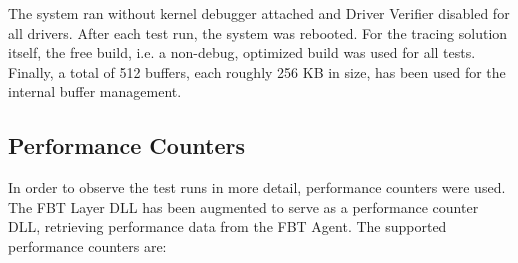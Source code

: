The system ran without kernel debugger attached and Driver Verifier disabled for all drivers.
After each test run, the system was rebooted. For the tracing solution itself, the free 
build, i.e. a non-debug, optimized build was used for all tests. Finally, a total of 512 
buffers, each roughly 256 KB in size, has been used for the internal buffer management.

\subsection{Performance Counters}
In order to observe the test runs in more detail, performance counters were used. The
FBT Layer DLL has been augmented to serve as a performance counter DLL, retrieving performance
data from the FBT Agent. The supported performance counters are:

